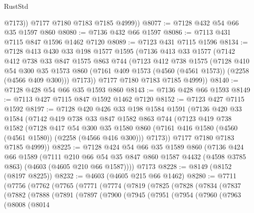 \begin{lexlean}{RustStd}
\begin{coremodule}
            @7173))
        @7177
        @7180
        @7183
        @7185
        @4999))
@8077 := @7128 @432 @54 @66 @35 @1597 @860
@8080 := @7136 @432 @66 @1597
@8086 := @7113 @431 @7115 @847 @1596 @1462 @7120
@8089 := @7123 @431 @7115 @1596
@8134 := @7128
    @413
    @430
    @33
    @198
    @1577
    @1595
    (@7136
      @413
      @33
      @1577
      (@7142
        @412
        @738
        @33
        @847
        @1575
        @863
        @744
        (@7123
          @412
          @738
          @1575
          (@7128
            @410
            @54
            @300
            @35
            @1573
            @860
            (@7161 @409 @1573 (@4560 (@4561 @1573)) (@2258 (@4566 @409 @300)))
            @7173))
        @7177
        @7180
        @7183
        @7185
        @4999))
@8140 := @7128 @428 @54 @66 @35 @1593 @860
@8143 := @7136 @428 @66 @1593
@8149 := @7113 @427 @7115 @847 @1592 @1462 @7120
@8152 := @7123 @427 @7115 @1592
@8197 := @7128
    @420
    @426
    @33
    @198
    @1584
    @1591
    (@7136
      @420
      @33
      @1584
      (@7142
        @419
        @738
        @33
        @847
        @1582
        @863
        @744
        (@7123
          @419
          @738
          @1582
          (@7128
            @417
            @54
            @300
            @35
            @1580
            @860
            (@7161 @416 @1580 (@4560 (@4561 @1580)) (@2258 (@4566 @416 @300)))
            @7173))
        @7177
        @7180
        @7183
        @7185
        @4999))
@8225 := @7128
    @424
    @54
    @66
    @35
    @1589
    @860
    (@7136
      @424
      @66
      @1589
      (@7111
        @210
        @66
        @54
        @35
        @847
        @860
        @1587
        @4432
        (@4598 @3785 @863)
        (@4603 (@4605 @210 @66 @1587))))
    @7173
@8228 := @8149 (@8152 (@8197 @8225))
@8232 := @4603 (@4605 @215 @66 @1462)
@8280 := @7711
    (@7756
      (@7762
        (@7765
          (@7771
            (@7774
              (@7819
                (@7825
                  (@7828
                    (@7834
                      (@7837
                        (@7882
                          (@7888
                            (@7891
                              (@7897
                                (@7900
                                  (@7945
                                    (@7951
                                      (@7954
                                        (@7960
                                          (@7963
                                            (@8008
                                              (@8014

\end{coremodule}
\end{lexlean}
